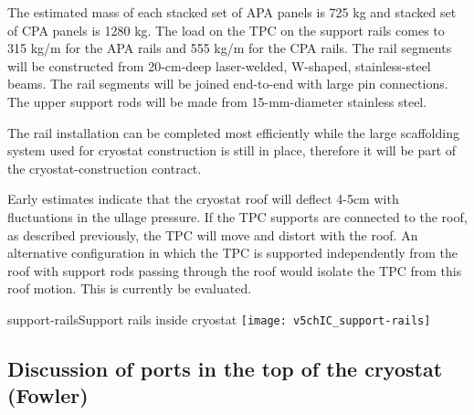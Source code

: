 The estimated mass of each stacked set of APA panels is 725 kg and stacked set of CPA panels is 1280 kg.  The load on the TPC on the support rails comes to 315 kg/m for the APA rails and 555 kg/m 
for the CPA rails.  The rail segments will be constructed from 20-cm-deep laser-welded, W-shaped, stainless-steel beams.  The rail segments will be joined end-to-end with large pin connections.  The 
upper support rods will be made from 15-mm-diameter stainless steel.

The rail installation can be completed most efficiently while the large scaffolding system used for cryostat construction is still in place, therefore it will be part of the cryostat-construction contract.

Early estimates indicate that the cryostat roof will deflect 4-5cm with fluctuations in the ullage pressure.  If the TPC supports are connected to the roof, as described previously, the TPC will move and distort with 
the roof.  An alternative configuration in which the TPC is supported independently from the roof with support rods passing through the roof would isolate the TPC from this roof motion. This is currently be evaluated.


\begin{cdrfigure}{support-rails}{Support rails inside cryostat}
\texttt{[image: v5chIC\_support-rails]}
\end{cdrfigure}

\subsection{Discussion of ports in the top of the cryostat (Fowler)}
\label{fd:install:integ:topports}

